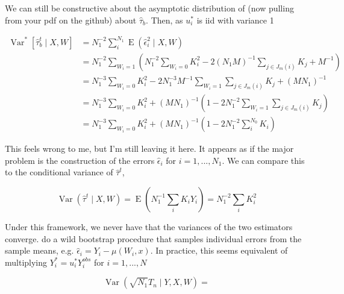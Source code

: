 \documentclass{article}
\DeclareMathOperator{\E}{E}
\DeclareMathOperator{\Var}{Var}
\newcommand{\hta}{\hat \tau^{t}}
\newcommand{\he}{\hat{\epsilon}_{i}}
\newcommand{\us}{u_{i}^{*}}
\begin{document}
We can still be constructive about the asymptotic distribution of (now pulling from your pdf on the github) about $\hat \tau_{b}$.  Then, as $\us$ is iid with variance 1

\begin{align*} \Var^{*}[\hat \tau_{b}^{t} \mid X,W] &= N_{1}^{-2}\sum_{i}^{N_{1}}\E(\he^{2} \mid X,W) \\
&= N_{1}^{-2}\sum_{W_{i}=1}\left(N_{1}^{-2}\sum_{W_{i}=0}K_{i}^{2}-2(N_{1}M)^{-1}\sum_{j \in J_{m}(i)}K_{j}+M^{-1}\right) \\
&= N_{1}^{-3}\sum_{W_{i}=0}K_{i}^{2}-2N_{1}^{-3}M^{-1}\sum_{W_{i}=1}\sum_{j \in J_{m}(i)}K_{j}+(MN_{1})^{-1} \\
&=N_{1}^{-3}\sum_{W_{i}=0}K_{i}^{2}+(MN_{1})^{-1}(1-2N_{1}^{-2}\sum_{W_{i}=1}\sum_{j \in J_{m}(i)}K_{j}) \\
&= N_{1}^{-3}\sum_{W_{i}=0}K_{i}^{2}+(MN_{1})^{-1}(1-2N_{1}^{-2}\sum_{i}^{N_{0}}K_{i})\end{align*}

This feels wrong to me, but I'm still leaving it here. It appears as if the major problem is the construction of the errors $\he$ for $i = 1,...,N_{1}$. We can compare this to the conditional variance of $\hta$,

$$\Var(\hta \mid X,W) = \E(N_{1}^{-1}\sum_{i}K_{i}Y_{i}) = N_{1}^{-2}\sum_{i}K_{i}^{2}$$

Under this framework, we never have that the variances of the two estimators converge. \cite{OnR:16} do a wild bootstrap procedure that samples individual errors from the sample means, e.g. $\he = Y_{i}-\mu(W_{i},x)$. In practice, this seems equivalent of multiplying $Y_{i}^{*} = \us Y_{i}^{obs}$ for $i = 1,...,N$

$$\Var(\sqrt{N_{1}}T_{n} \mid Y,X,W) = $$



\printbibliography
\end{document}
